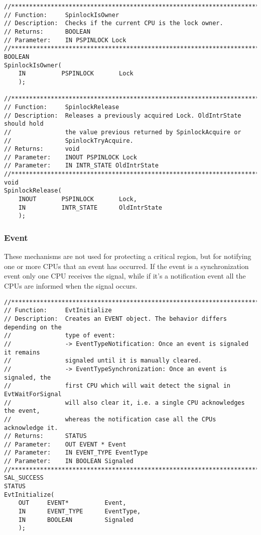 \begin{appendices}
\begin{lstlisting}[caption={Spinlock Interface},label={lst:Spinlock}]
//******************************************************************************
// Function:     SpinlockIsOwner
// Description:  Checks if the current CPU is the lock owner.
// Returns:      BOOLEAN
// Parameter:    IN PSPINLOCK Lock
//******************************************************************************
BOOLEAN
SpinlockIsOwner(
    IN          PSPINLOCK       Lock
    );

//******************************************************************************
// Function:     SpinlockRelease
// Description:  Releases a previously acquired Lock. OldIntrState should hold
//               the value previous returned by SpinlockAcquire or
//               SpinlockTryAcquire.
// Returns:      void
// Parameter:    INOUT PSPINLOCK Lock
// Parameter:    IN INTR_STATE OldIntrState
//******************************************************************************
void
SpinlockRelease(
    INOUT       PSPINLOCK       Lock,
    IN          INTR_STATE      OldIntrState
    );
\end{lstlisting}

\subsubsection{Event}

These mechanisms are not used for protecting a critical region, but for notifying one or more CPUs
that an event has occurred. If the event is a synchronization event only one CPU receives the signal,
while if it's a notification event all the CPUs are informed when the signal occurs.

\begin{lstlisting}[caption={Event Interface},label={lst:Event}]
//******************************************************************************
// Function:     EvtInitialize
// Description:  Creates an EVENT object. The behavior differs depending on the
//               type of event:
//               -> EventTypeNotification: Once an event is signaled it remains
//               signaled until it is manually cleared.
//               -> EventTypeSynchronization: Once an event is signaled, the
//               first CPU which will wait detect the signal in EvtWaitForSignal
//               will also clear it, i.e. a single CPU acknowledges the event,
//               whereas the notification case all the CPUs acknowledge it.
// Returns:      STATUS
// Parameter:    OUT EVENT * Event
// Parameter:    IN EVENT_TYPE EventType
// Parameter:    IN BOOLEAN Signaled
//******************************************************************************
SAL_SUCCESS
STATUS
EvtInitialize(
    OUT     EVENT*          Event,
    IN      EVENT_TYPE      EventType,
    IN      BOOLEAN         Signaled
    );


\end{lstlisting}
\end{appendices}
